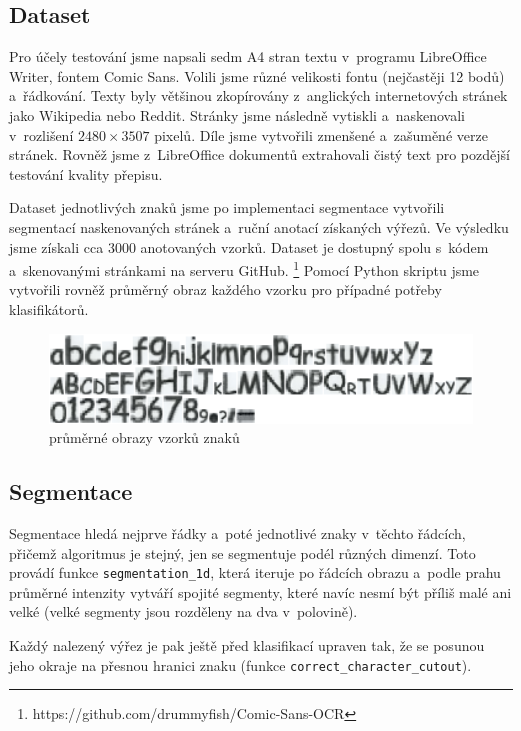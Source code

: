 \documentclass[12pt]{article}
\begin{document}
\subsection{Dataset}
\label{sec:dataset}

Pro účely testování jsme napsali sedm A4 stran textu v~programu LibreOffice Writer, fontem Comic Sans. Volili jsme
různé velikosti fontu (nejčastěji 12 bodů) a~řádkování. Texty byly většinou zkopírovány z~anglických internetových
stránek jako Wikipedia nebo Reddit. Stránky jsme následně vytiskli a~naskenovali v~rozlišení $2480 \times 3507$ pixelů.
Díle jsme vytvořili zmenšené a~zašuměné verze stránek. Rovněž jsme z~LibreOffice dokumentů extrahovali čistý text
pro pozdější testování kvality přepisu.

Dataset jednotlivých znaků jsme po implementaci segmentace vytvořili segmentací naskenovaných stránek a~ruční
anotací získaných výřezů. Ve výsledku jsme získali cca 3000 anotovaných vzorků. Dataset je dostupný spolu s~kódem a~skenovanými stránkami
na serveru GitHub. \footnote{https://github.com/drummyfish/Comic-Sans-OCR} Pomocí Python skriptu jsme
vytvořili rovněž průměrný obraz každého vzorku pro případné potřeby klasifikátorů.

\begin{figure}[htb]
  \centering
  \includegraphics[width=13.5cm,keepaspectratio]{averages.png}
  \caption{průměrné obrazy vzorků znaků}
  \label{fig:avg}
\end{figure}

\subsection{Segmentace}

Segmentace hledá nejprve řádky a~poté jednotlivé znaky v~těchto řádcích, přičemž algoritmus je stejný, jen
se segmentuje podél různých dimenzí. Toto provádí funkce {\tt segmentation\_1d}, která iteruje po
řádcích obrazu a~podle prahu průměrné intenzity vytváří spojité segmenty, které navíc nesmí být příliš malé
ani velké (velké segmenty jsou rozděleny na dva v~polovině).

Každý nalezený výřez je pak ještě před klasifikací upraven tak, že se posunou jeho okraje na přesnou hranici znaku
(funkce {\tt correct\_character\_cutout}).
\end{document}
